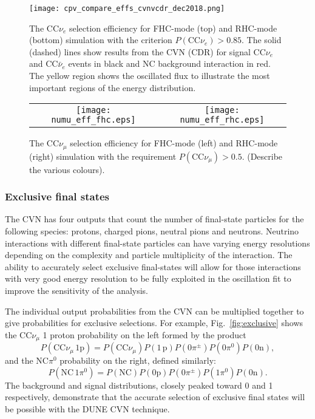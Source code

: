 \begin{figure}
    \centering
		\texttt{[image: cpv\_compare\_effs\_cvnvcdr\_dec2018.png]} %
	\caption{The CC$\nu_e$ selection efficiency for FHC-mode (top) and RHC-mode (bottom) simulation with the criterion $P(\textrm{CC}\nu_e) > 0.85$. The solid (dashed) lines show results from the CVN (CDR) for signal CC$\nu_e$ and CC$\bar{\nu}_e$ events in black and NC background interaction in red. The yellow region shows the oscillated flux to illustrate the most important regions of the energy distribution.}
    \label{fig:nueeff}
\end{figure}

\begin{figure}
    \centering
    \begin{tabular}{cc}
		\texttt{[image: numu\_eff\_fhc.eps]} &
		\texttt{[image: numu\_eff\_rhc.eps]} 
	\end{tabular}
	\caption{The CC$\nu_\mu$ selection efficiency for FHC-mode (left) and RHC-mode (right) simulation with the requirement $P(\textrm{CC}\nu_\mu) > 0.5$. (Describe the various colours).}
    \label{fig:numueff}
\end{figure}

\subsubsection{Exclusive final states}
The CVN has four outputs that count the number of final-state particles for the following species: protons, charged pions, neutral pions and neutrons. Neutrino interactions with different final-state particles can have varying energy resolutions depending on the complexity and particle multiplicity of the interaction. The ability to accurately select exclusive final-states will allow for those interactions with very good energy resolution to be fully exploited in the oscillation fit to improve the sensitivity of the analysis.

The individual output probabilities from the CVN can be multiplied together to give probabilities for exclusive selections. For example, Fig.~\ref{fig:exclusive} shows the CC$\nu_\mu$ 1 proton probability on the left formed by the product 
\begin{equation}
P\left(\textrm{CC}\nu_\mu\,1\textrm{p}\right) = P\left(\textrm{CC}\nu_\mu \right) P\left( 1\,\textrm{p} \right) P\left( 0 \pi^\pm \right)P\left( 0 \pi^0 \right) P\left( 0\textrm{n} \right),
\end{equation}
and the NC$\pi^0$ probability on the right, defined similarly: 
\begin{equation}
P\left(\textrm{NC}\,1\pi^0\right) = P\left(\textrm{NC}\right) P\left(0\textrm{p} \right) P\left(0\pi^\pm \right) P\left(1\pi^0 \right) P\left( 0\textrm{n} \right).
\end{equation}
The background and signal distributions, closely peaked toward 0 and 1 respectively, demonstrate that the accurate selection of exclusive final states will be possible with the DUNE CVN technique. 

